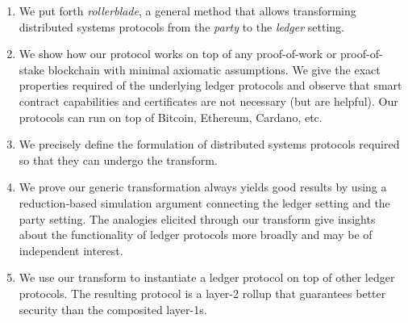 \begin{enumerate}
  \item We put forth \emph{rollerblade}, a general method that allows transforming
        distributed systems protocols from the \emph{party} to the \emph{ledger}
        setting.
  \item We show how our protocol works on top of any proof-of-work or proof-of-stake
        blockchain with minimal axiomatic assumptions. We give the exact properties
        required of the underlying ledger protocols and observe that smart contract
        capabilities and certificates are not necessary (but are helpful). Our
        protocols can run on top of Bitcoin, Ethereum, Cardano, etc.
  \item We precisely define the formulation of distributed systems protocols
        required so that they can undergo the \rollerblade transform.
  \item We prove our generic transformation always yields good results by
        using a reduction-based simulation argument connecting the
        ledger setting and the party setting. The analogies elicited through
        our transform give insights about the functionality of ledger protocols
        more broadly and may be of independent interest.
  \item We use our transform to instantiate a ledger protocol on top of
        other ledger protocols. The resulting protocol is a layer-2 rollup that
        guarantees better security than the composited layer-1s.
\end{enumerate}

